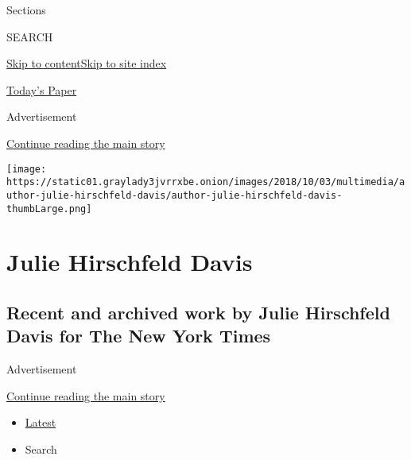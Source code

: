 Sections

SEARCH

\protect\hyperlink{site-content}{Skip to
content}\protect\hyperlink{site-index}{Skip to site index}

\href{https://myaccount.nytimes3xbfgragh.onion/auth/login?response_type=cookie\&client_id=vi}{}

\href{https://www.nytimes3xbfgragh.onion/section/todayspaper}{Today's
Paper}

Advertisement

\protect\hyperlink{after-top}{Continue reading the main story}

\texttt{[image: https://static01.graylady3jvrrxbe.onion/images/2018/10/03/multimedia/author-julie-hirschfeld-davis/author-julie-hirschfeld-davis-thumbLarge.png]}

\hypertarget{julie-hirschfeld-davis}{%
\section{Julie Hirschfeld Davis}\label{julie-hirschfeld-davis}}

\hypertarget{recent-and-archived-work-by-julie-hirschfeld-davis-for-the-new-york-times}{%
\subsection{Recent and archived work by Julie Hirschfeld Davis for The
New York
Times}\label{recent-and-archived-work-by-julie-hirschfeld-davis-for-the-new-york-times}}

Advertisement

\protect\hyperlink{after-mid1}{Continue reading the main story}

\begin{itemize}
\tightlist
\item
  \protect\hyperlink{stream-panel}{Latest}
\item
  Search
\end{itemize}

